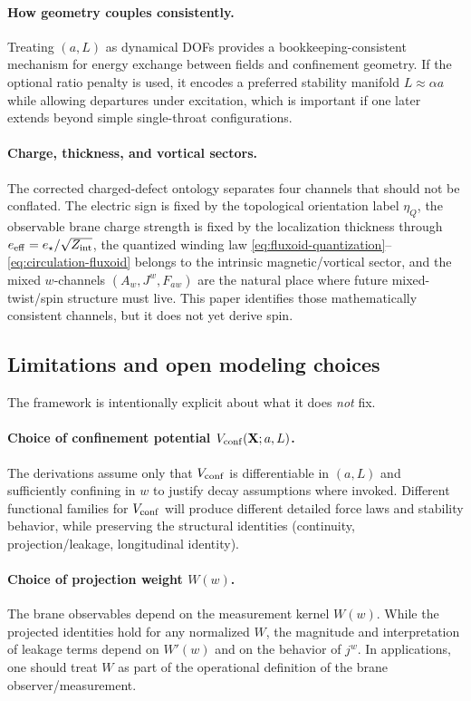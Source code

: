 \documentclass[11pt]{article}
\newcommand{\etaQ}{\eta_Q}
\newcommand{\estar}{e_\star}
\newcommand{\eeff}{e_{\rm eff}}
\newcommand{\Zint}{Z_{\rm int}}
\begin{document}
\paragraph{How geometry couples consistently.}
Treating $(a,L)$ as dynamical DOFs provides a bookkeeping-consistent mechanism for energy exchange between fields and confinement geometry. If the optional ratio penalty is used, it encodes a preferred stability manifold $L\approx \alpha a$ while allowing departures under excitation, which is important if one later extends beyond simple single-throat configurations.

\paragraph{Charge, thickness, and vortical sectors.}
The corrected charged-defect ontology separates four channels that should not be conflated. The electric sign is fixed by the topological orientation label $\etaQ$, the observable brane charge strength is fixed by the localization thickness through $\eeff=\estar/\sqrt{\Zint}$, the quantized winding law \eqref{eq:fluxoid-quantization}--\eqref{eq:circulation-fluxoid} belongs to the intrinsic magnetic/vortical sector, and the mixed $w$-channels $(A_w,J^w,F_{a w})$ are the natural place where future mixed-twist/spin structure must live. This paper identifies those mathematically consistent channels, but it does not yet derive spin.

\subsection{Limitations and open modeling choices}
\label{sec:discussion-limitations}

The framework is intentionally explicit about what it does \emph{not} fix.

\paragraph{Choice of confinement potential $V_{\rm conf}(\mathbf{X};a,L)$.}
The derivations assume only that $V_{\rm conf}$ is differentiable in $(a,L)$ and sufficiently confining in $w$ to justify decay assumptions where invoked. Different functional families for $V_{\rm conf}$ will produce different detailed force laws and stability behavior, while preserving the structural identities (continuity, projection/leakage, longitudinal identity).

\paragraph{Choice of projection weight $W(w)$.}
The brane observables depend on the measurement kernel $W(w)$. While the projected identities hold for any normalized $W$, the magnitude and interpretation of leakage terms depend on $W'(w)$ and on the behavior of $j^w$. In applications, one should treat $W$ as part of the operational definition of the brane observer/measurement.
\end{document}
